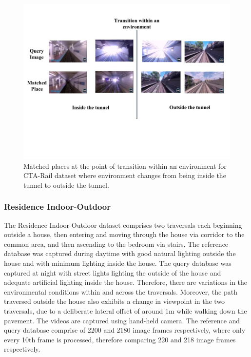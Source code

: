 \documentclass[letterpaper, 10 pt, conference]{ieeeconf}  %
\begin{document}
\begin{figure}
 \includegraphics[clip, trim=0.5cm 8cm 1cm 2.5cm,scale=0.25]{PlaceMatchesAtTransition}
 \caption{Matched places at the point of transition within an environment for CTA-Rail dataset where environment changes from being inside the tunnel to outside the tunnel.}
 \label{fig:placeMatches}
\end{figure}

\subsubsection{Residence Indoor-Outdoor}
The Residence Indoor-Outdoor dataset comprises two traversals each beginning outside a house, then entering and moving through the house via corridor to the common area, and then ascending to the bedroom via stairs. The reference database was captured during daytime with good natural lighting outside the house and with minimum lighting inside the house. The query database was captured at night with street lights lighting the outside of the house and adequate artificial lighting inside the house. Therefore, there are variations in the environmental conditions within and across the traversals. Moreover, the path traversed outside the house also exhibits a change in viewpoint in the two traversals, due to a deliberate lateral offset of around 1m while walking down the pavement. The videos are captured using hand-held camera. The reference and query database comprise of 2200 and 2180 image frames respectively, where only every 10th frame is processed, therefore comparing 220 and 218 image frames respectively.
\end{document}
